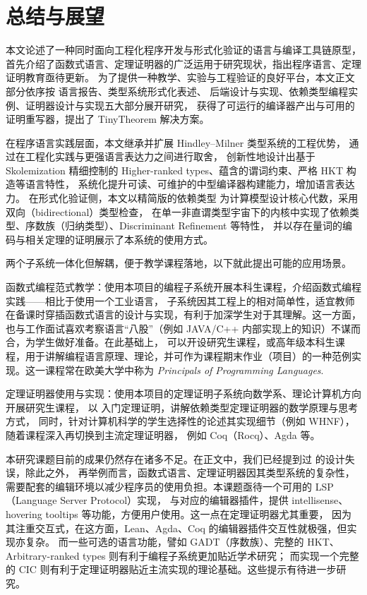 \chapter{总结与展望}
本文论述了一种同时面向工程化程序开发与形式化验证的语言与编译工具链原型，
首先介绍了函数式语言、定理证明器的广泛运用于研究现状，指出程序语言、定理证明教育亟待更新。
为了提供一种教学、实验与工程验证的良好平台，本文正文部分依序按 \Tigris 语言报告、类型系统形式化表述、
后端设计与实现、依赖类型编程实例、\Tigrisd 证明器设计与实现五大部分展开研究，
获得了可运行的编译器产出与可用的证明重写器，提出了 TinyTheorem 解决方案。

在程序语言实践层面，本文继承并扩展 Hindley–Milner 类型系统的工程优势，
通过在工程化实践与更强语言表达力之间进行取舍，
创新性地设计出基于 Skolemization 精细控制的 Higher-ranked types、蕴含的谓词约束、严格 HKT 构造等语言特性，
系统化提升可读、可维护的中型编译器构建能力，增加语言表达力。
在形式化验证侧，本文以精简版的依赖类型 \lambdacalc 为计算模型设计核心代数，采用双向（bidirectional）类型检查，
在单一非直谓类型宇宙下的内核中实现了依赖类型、序数族（归纳类型）、Discriminant Refinement 等特性，
并以存在量词的编码与相关定理的证明展示了本系统的使用方式。

两个子系统一体化但解耦，便于教学课程落地，以下就此提出可能的应用场景。

函数式编程范式教学：使用本项目的编程子系统开展本科生课程，介绍函数式编程实践——相比于使用一个工业语言，
子系统因其工程上的相对简单性，适宜教师在备课时穿插函数式语言的设计与实现，有利于加深学生对于其理解。这一方面，
也与工作面试喜欢考察语言“八股”（例如 JAVA/C++ 内部实现上的知识）不谋而合，为学生做好准备。在此基础上，
可以开设研究生课程，或高年级本科生课程，用于讲解编程语言原理、理论，并可作为课程期末作业（项目）的一种范例实现。这一课程常在欧美大学中称为
\emph{Principals of Programming Languages}.

定理证明器使用与实现：使用本项目的定理证明子系统向数学系、理论计算机方向开展研究生课程，
以 \Tigrisd 入门定理证明，讲解依赖类型定理证明器的数学原理与思考方式，
同时，针对计算机科学的学生选择性的论述其实现细节（例如 WHNF），随着课程深入再切换到主流定理证明器，
例如 Coq（Rocq）、Agda 等。

本研究课题目前的成果仍然存在诸多不足。在正文中，我们已经提到过 \Lambdair 的设计失误，除此之外，
再举例而言，函数式语言、定理证明器因其类型系统的复杂性，
需要配套的编辑环境以减少程序员的使用负担。本课题亟待一个可用的 LSP（Language Server Protocol）实现，
与对应的编辑器插件，提供 intellisense、hovering tooltips 等功能，方便用户使用。这一点在定理证明器尤其重要，
因为其注重交互式，在这方面，Lean、Agda、Coq 的编辑器插件交互性就极强，但实现亦复杂。
而一些可选的语言功能，譬如 GADT（序数族）、完整的 HKT、Arbitrary-ranked types 则有利于编程子系统更加贴近学术研究；
而实现一个完整的 CIC 则有利于定理证明器贴近主流实现的理论基础。这些提示有待进一步研究。
